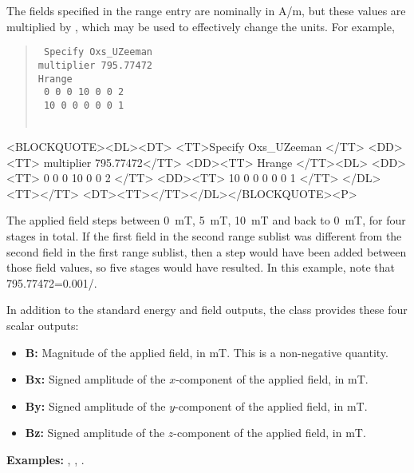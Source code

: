 \begin{itemize}
\begin{description}
   The fields specified in the range entry are nominally in A/m, but
   these values are multiplied by , which may be used to
   effectively change the units.  For example,
   \begin{latexonly}
      \begin{quote}\tt
      Specify Oxs\_UZeeman \ocb \\
         \bi multiplier 795.77472\\
         \bi Hrange \ocb\\
         \bi\bi \ocb\ 0 0 0 10 0 0 2 \ccb\\
         \bi\bi \ocb\ 10 0 0 0 0 0 1 \ccb\\
         \bi\ccb\\
      \ccb
      \end{quote}
   \end{latexonly}
   \begin{rawhtml}<BLOCKQUOTE><DL><DT>
      <TT>Specify Oxs_UZeeman {</TT>
         <DD><TT> multiplier 795.77472</TT>
         <DD><TT> Hrange {</TT><DL>
              <DD><TT> { 0 0 0 10 0 0 2 }</TT>
              <DD><TT> { 10 0 0 0 0 0 1 }</TT>
         </DL><TT>}</TT>
   <DT><TT>}</TT></DL></BLOCKQUOTE><P>
   \end{rawhtml}
   The applied field steps between 0~mT, 5~mT, 10~mT and back to 0~mT,
   for four stages in total.  If the first field in the second range
   sublist was different from the second field in the first range
   sublist, then a step would have been added between those field
   values, so five stages would have resulted.  In this example, note
   that 795.77472=0.001/\munaught.

   In addition to the standard energy and field outputs, the
    class provides these four scalar outputs:
   \begin{itemize}
   \item \textbf{B:} Magnitude of the applied field, in
   mT.  This is a non-negative quantity.
   \item \textbf{Bx:} Signed amplitude of the $x$-component
   of the applied field, in mT.
   \item \textbf{By:} Signed amplitude of the $y$-component
   of the applied field, in mT.
   \item \textbf{Bz:} Signed amplitude of the $z$-component
   of the applied field, in mT.
   \end{itemize}

   \textbf{Examples:} , , .


\end{description}
\end{itemize}
